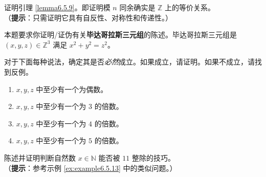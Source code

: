 \begin{exercise}\label{exc:exercises6.7.16}
    证明引理 \ref{lemma6.5.9}。即证明模 $n$ 同余确实是 $\mathbb{Z}$ 上的等价关系。\\
    （\textbf{提示}：只需证明它具有自反性、对称性和传递性。）
\end{exercise}

\begin{exercise}
    本题要求你证明/证伪有关\textbf{毕达哥拉斯三元组}的陈述。毕达哥拉斯三元组是 $(x,y,z) \in \mathbb{Z}^3$ 满足 $x^2+y^2=z^2$。 

    对于下面每种说法，确定其是否\emph{必然}成立。如果成立，请证明。如果不成立，请找到反例。
    \begin{enumerate}[label=(\alph*)]
        \item ${x,y,z}$ 中至少有一个为偶数。
        \item ${x,y,z}$ 中至少有一个为 $3$ 的倍数。
        \item ${x,y,z}$ 中至少有一个为 $4$ 的倍数。
        \item ${x,y,z}$ 中至少有一个为 $5$ 的倍数。
    \end{enumerate}
\end{exercise}

\begin{exercise}
    陈述并证明判断自然数 $x \in \mathbb{N}$ 能否被 $11$ 整除的技巧。\\
    （\textbf{提示}：参考示例 \ref{ex:example6.5.13} 中的类似问题。）
\end{exercise}

